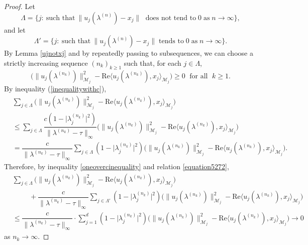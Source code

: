 \documentclass[11pt, reqno]{amsart}
\newcommand\1{\boldsymbol {1}}
\numberwithin{equation}{section}
\begin{document}
\begin{proof}
Let $$\Lambda = \{ j: \ \text{such that} \ \|u_{j}(\lambda^{(n)}) - x_j\| \; \text{ does not tend to} \; 0 \; \text{as} \; n\rightarrow \infty \},$$
and let $$\Lambda'= \{ j: \ \text{such that} \ \|u_{j}(\lambda^{(n)}) - x_j\| \; \text{tends to} \; 0 \; \text{as} \; n \rightarrow \infty \}.$$
 By Lemma \ref{ujnotxj} and by repeatedly passing to subsequences, we can choose a strictly increasing sequence 
 $(n_k)_{k \ge 1}$ such that,  for each $j \in \Lambda$, 
$$\Big(\|u_{j}(\lambda^{(n_k)})\|_{\mathcal{M}_{j}}^{2}-\mathrm{Re} \langle u_{j}(\lambda^{(n_k)}),x_{j}\rangle_{\mathcal{M}_{j}} \Big) \geq 0  \; \text{ for all } \; k \ge1.$$
By inequality (\ref{inequalitywithc}), 
\begin{align}
& \sum_{j \in \Lambda}\Big(\|u_{j}(\lambda^{(n_k)})\|_{\mathcal{M}_{j}}^{2}-\mathrm{Re} \langle u_{j}(\lambda^{(n_k)}),x_{j}\rangle_{\mathcal{M}_{j}} \Big) \nonumber\\
& \leq \sum_{j \in \Lambda} \dfrac{c (1-\lvert \lambda^{(n_k)}_{j} \rvert^{2})}{\|\lambda^{(n_k)}-\tau\|_{\infty}} 
\Big(\|u_{j}(\lambda^{(n_k)})\|_{\mathcal{M}_{j}}^{2}-\mathrm{Re} \langle u_{j}(\lambda^{(n_k)}),x_{j}\rangle_{\mathcal{M}_{j}} \Big)\nonumber\\
&= \dfrac{c}{\|\lambda^{(n_k)}-\tau\|_{\infty}}\sum_{j \in \Lambda}(1-\lvert \lambda^{(n_k)}_{j} \rvert^{2})\Big(\|u_{j}(\lambda^{(n_k)})\|_{\mathcal{M}_{j}}^{2}-\mathrm{Re} \langle u_{j}(\lambda^{(n_k)}),x_{j}\rangle_{\mathcal{M}_{j}} \Big).\label{oneovercinequality}
\end{align}
Therefore, by inequality \eqref{oneovercinequality} and relation \eqref{equation5272},
\begin{align}
& \sum_{j \in \Lambda}\Big(\|u_{j}(\lambda^{(n_k)})\|_{\mathcal{M}_{j}}^{2}-\mathrm{Re} \langle u_{j}(\lambda^{(n_k)}),x_{j}\rangle_{\mathcal{M}_{j}} \Big) \nonumber\\
& \hspace{1cm} +\dfrac{c}{\|\lambda^{(n_k)}-\tau\|_{\infty}}\sum_{j \in \Lambda'}(1-\lvert \lambda^{(n_k)}_{j} \rvert^{2})\Big(\|u_{j}(\lambda^{(n_k)})\|_{\mathcal{M}_{j}}^{2}-\mathrm{Re} \langle u_{j}(\lambda^{(n_k)}),x_{j}\rangle_{\mathcal{M}_{j}} \Big)\nonumber\\
&\leq \dfrac{c}{\|\lambda^{(n_k)}-\tau\|_{\infty}}\cdot\sum_{j=1}^{d}(1-\lvert \lambda^{(n_k)}_{j} \rvert^{2})\Big(\|u_{j}(\lambda^{(n_k)})\|_{\mathcal{M}_{j}}^{2}-\mathrm{Re} \langle u_{j}(\lambda^{(n_k)}),x_{j}\rangle_{\mathcal{M}_{j}} \Big)
 \to 0  \label{oneovercinequality2}
\end{align}
 as $ n_k \rightarrow  \infty$.

\end{proof}
\end{document}
